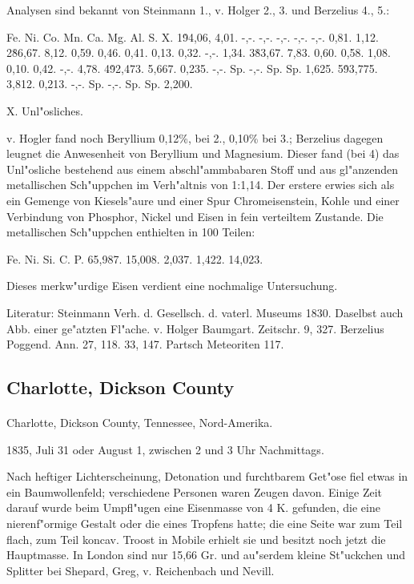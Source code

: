 \documentclass[a4paper, 11pt, oneside]{article}
\begin{document}
Analysen sind bekannt von Steinmann 1., v. Holger 2., 3. und Berzelius 4., 5.:

Fe. Ni. Co. Mn. Ca. Mg. Al. S. X.  
1\. 94,06, 4,01. -,-. -,-. -,-. -,-. -,-. 0,81. 1,12.  
2\. 86,67. 8,12. 0,59. 0,46. 0,41. 0,13. 0,32. -,-. 1,34.  
3\. 83,67. 7,83. 0,60. 0,58. 1,08. 0,10. 0,42. -,-. 4,78.  
4\. 92,473. 5,667. 0,235. -,-. Sp. -,-. Sp. Sp. 1,625.  
5\. 93,775. 3,812. 0,213. -,-. Sp. -,-. Sp. Sp. 2,200.

X. Unl"osliches.

v. Hogler fand noch Beryllium 0,12\%, bei 2., 0,10\% bei 3.; Berzelius dagegen leugnet die Anwesenheit von Beryllium und Magnesium. Dieser fand (bei 4) das Unl"osliche bestehend aus einem abschl"ammbabaren Stoff und aus gl"anzenden metallischen Sch"uppchen im Verh"altnis von 1:1,14. Der erstere erwies sich als ein Gemenge von Kiesels"aure und einer Spur Chromeisenstein, Kohle und einer Verbindung von Phosphor, Nickel und Eisen in fein verteiltem Zustande. Die metallischen Sch"uppchen enthielten in 100 Teilen:

Fe. Ni. Si. C. P.  
65,987. 15,008. 2,037. 1,422. 14,023.

Dieses merkw"urdige Eisen verdient eine nochmalige Untersuchung.

Literatur: Steinmann Verh. d. Gesellsch. d. vaterl. Museums 1830. Daselbst auch Abb. einer ge"atzten Fl"ache. v. Holger Baumgart. Zeitschr. 9, 327. Berzelius Poggend. Ann. 27, 118. 33, 147. Partsch Meteoriten 117.

\subsection{Charlotte, Dickson County}
\normalsize
\paragraph{}
Charlotte, Dickson County, Tennessee, Nord-Amerika.

1835, Juli 31 oder August 1, zwischen 2 und 3 Uhr Nachmittags.

Nach heftiger Lichterscheinung, Detonation und furchtbarem Get"ose fiel etwas in ein Baumwollenfeld; verschiedene Personen waren Zeugen davon. Einige Zeit darauf wurde beim Umpfl"ugen eine Eisenmasse von 4 K. gefunden, die eine nierenf"ormige Gestalt oder die eines Tropfens hatte; die eine Seite war zum Teil flach, zum Teil koncav. Troost in Mobile erhielt sie und besitzt noch jetzt die Hauptmasse. In London sind nur 15,66 Gr. und au"serdem kleine St"uckchen und Splitter bei Shepard, Greg, v. Reichenbach und Nevill.
\end{document}
